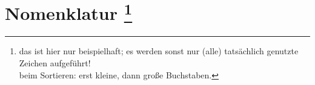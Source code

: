 %
%
\chapter*{Nomenklatur%
  \footnote{ das ist hier nur beispielhaft; es werden sonst nur (alle) tatsächlich genutzte Zeichen aufgeführt!\\
	beim Sortieren: erst kleine, dann große Buchstaben.} }%
  \label{Nomenklatur}%
\manualmark
{}
